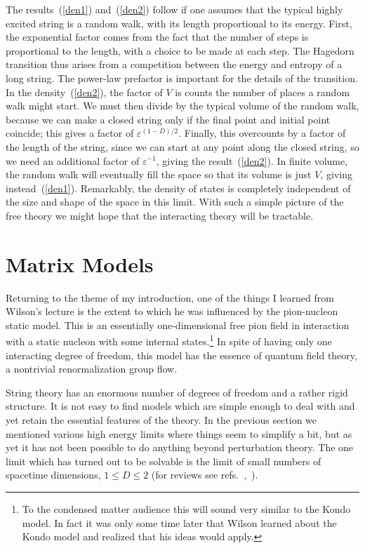 The results~(\ref{den1}) and~(\ref{den2}) follow if one assumes that
the typical highly excited string is a random walk, with its length
proportional to its energy.  First, the exponential factor
comes from the fact that the number of steps is proportional to the
length, with a choice to be made at each step.  The Hagedorn
transition thus arises from a competition between the energy and entropy
of a long string.
The power-law prefactor is important for the details of
the transition.  In the density~(\ref{den2}), the factor of $V$ is
counts the number of places a random walk might start.  We must then
divide by the typical volume of the random walk, because we can make
a closed string only if the final point and initial point coincide;
this gives a factor of $\varepsilon^{(1-D)/2}$.  Finally, this
overcounts by a factor of the length of the string, since we can
start at any point along the closed string, so we need an additional
factor of $\varepsilon^{-1}$, giving the result~(\ref{den2}).
In finite volume, the random walk will eventually fill the space
so that its volume is just $V$, giving instead~(\ref{den1}).
Remarkably, the density of states is completely independent of the
size and shape of the space in this limit.
With such a simple picture of the free theory we might hope that the
interacting theory will be tractable.

\section{Matrix Models}
\setcounter{footnote}{0}


Returning to the theme of my introduction,
one of the things I learned from Wilson's lecture is the extent to
which he was influenced by the pion-nucleon static model.  This is
an essentially one-dimensional free pion field in interaction with a
static nucleon with some internal states.\footnote{To the condensed
matter audience this will sound very similar to the Kondo model.  In
fact it was only some time later that Wilson learned about the Kondo
model and realized that his ideas would apply.}  In spite of having
only one interacting degree of freedom, this model has the essence
of quantum field theory, a nontrivial renormalization
group flow.

String theory has an enormous number of degrees of freedom and a
rather rigid structure.  It is not easy to find models which
are simple enough to deal with and yet retain the essential
features of the theory.  In the previous section we mentioned
various high energy limits where things seem to simplify a bit, but
as yet it has not been possible to do anything beyond perturbation
theory.  The one limit which has turned out to be solvable is the
limit of small numbers of spacetime dimensions,
$1 \leq D \leq 2$ (for reviews see
refs.~\cite{GMtasi},~\cite{Krev}).

